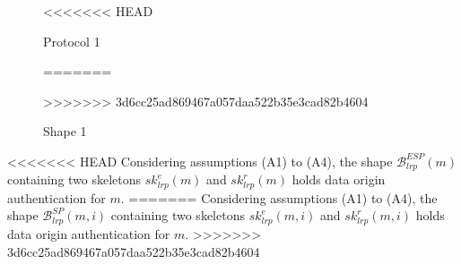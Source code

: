 \begin{figure}
\begin{center}
\end{center}
<<<<<<< HEAD
\caption{Protocol 1} 
=======
\caption{Shape 1} 
>>>>>>> 3d6cc25ad869467a057daa522b35e3cad82b4604
\label{protocol1}
\end{figure}

\begin{Proposition}
<<<<<<< HEAD
Considering assumptions (A1) to (A4), the shape $\mathcal{B}^{ESP}_{lrp}(m)$ containing two skeletons $sk^e_{lrp}(m)$ and $sk^r_{lrp}(m)$ holds data origin authentication for $m$. 
=======
Considering assumptions (A1) to (A4), the shape $\mathcal{B}^{SP}_{lrp}(m,i)$ containing two skeletons $sk^e_{lrp}(m,i)$ and $sk^r_{lrp}(m,i)$ holds data origin authentication for $m$. 
>>>>>>> 3d6cc25ad869467a057daa522b35e3cad82b4604
\end{Proposition}

